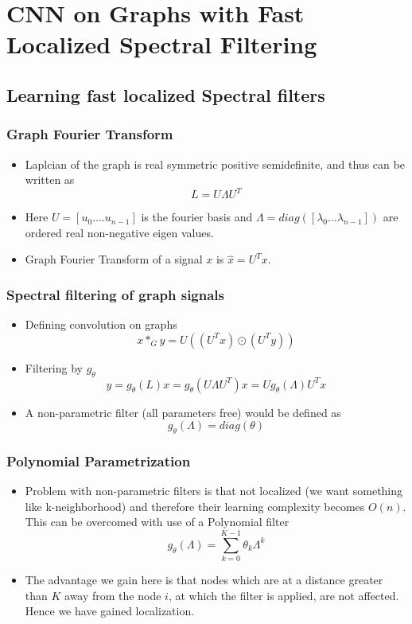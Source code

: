 \documentclass{beamer}
\begin{document}
\section{CNN on Graphs with Fast Localized Spectral Filtering}
\subsection{Learning fast localized Spectral filters}
\begin{frame}
  \frametitle{Graph Fourier Transform}
  \begin{itemize}
  \item Laplcian of the graph is real symmetric positive semidefinite, and thus can be written as
    $$L = U \Lambda U^{T}$$
  \item Here $U = [u_0 .... u_{n-1}]$ is the fourier basis and $\Lambda = diag([\lambda_0...\lambda_{n-1}])$ are ordered real non-negative eigen values.
  \item Graph Fourier Transform of a signal $x$ is $\hat{x} = U^{T}x$.
  \end{itemize}
\end{frame}

\begin{frame}
  \frametitle{Spectral filtering of graph signals}
  \begin{itemize}
  \item Defining convolution on graphs
    $$ x *_{G} y = U((U^T x) \odot (U^T y))$$
  \item Filtering by $g_{\theta}$
    $$ y = g_{\theta}(L)x = g_{\theta}(U \Lambda U^{T})x = Ug_{\theta}(\Lambda) U^T x $$
  \item A non-parametric filter (all parameters free) would be defined as
    $$g_{\theta}(\Lambda) = diag(\theta)$$
  \end{itemize}
\end{frame}

\begin{frame}
  \frametitle{Polynomial Parametrization}
  \begin{itemize}
  \item   Problem with non-parametric filters is that not localized (we want something like k-neighborhood) and therefore their learning complexity becomes $O(n)$. This can be overcomed with use of a Polynomial filter
    $$g_{\theta}(\Lambda) = \sum_{k = 0}^{K-1}\theta_k\Lambda^k$$
  \item The advantage we gain here is that nodes which are at a distance greater than $K$ away from the node $i$, at which the filter is applied, are not affected. Hence we have gained localization.
  \end{itemize}
\end{frame}
\end{document}
